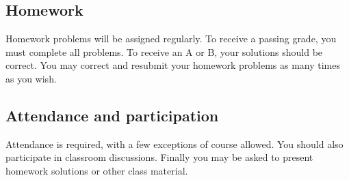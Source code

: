 \documentclass[12pt,oneside]{amsart}
\begin{document}
\subsection*{Homework}
Homework problems will be assigned regularly. To receive a passing grade, you must complete all problems. To receive an A or B, your solutions should be correct. You may correct and resubmit your homework problems as many times as you wish.

\subsection*{Attendance and participation}
Attendance is required, with a few exceptions of course allowed. You should also participate in classroom discussions. Finally you may be asked to present homework solutions or other class material.
\end{document}

